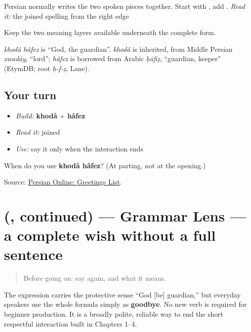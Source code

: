 Persian normally writes the two spoken pieces together. Start with \textbf{}, add \textbf{}. \emph{Read it:} the joined spelling \textbf{} from the right edge

Keep the two meaning layers available underneath the complete form.

\begin{cousinweb}
\emph{khodâ hâfez} is \textquotedblleft{}God, the guardian\textquotedblright{}. \emph{khodâ} is inherited, from Middle Persian \emph{xwadāy}, \textquotedblleft{}lord\textquotedblright{}; \emph{hâfez} is borrowed from Arabic \emph{ḥāfiẓ}, \textquotedblleft{}guardian, keeper\textquotedblright{} (EtymDB; root \emph{ḥ-f-ẓ}, Lane).
\end{cousinweb}

\subsection*{Your turn}
\begin{itemize}
\raggedright
  \item \emph{Build:} \textbf{khodâ} + \textbf{hâfez}
  \item \emph{Read it:} joined \textbf{}
  \item \emph{Use:} say it only when the interaction ends
\end{itemize}

\begin{tcolorbox}[breakable,colback=teal!4,colframe=teal!35!black,title={Before you move on}]
When do you use \textbf{khodâ hâfez}? (At parting, not at the opening.)

Source: \href{https://sites.la.utexas.edu/persian\_online\_resources/vocabulary-lists/meetings-introductions/}{Persian Online: Greetings List}.
\end{tcolorbox}
\section[\texorpdfstring{(\fa{خداحافظ}, continued)}{(خداحافظ, continued)}]{(, continued) — Grammar Lens — a complete wish without a full sentence}

\label{lesson:FA-C05-khodahafez-more}



\begin{quote}
Before going on: say \textbf{} again, and what it means.
\end{quote}

\begin{grammarlens}[title={Grammar Lens — a complete wish without a full sentence}]
The expression carries the protective sense “God {[}be{]} guardian,” but everyday speakers use the whole formula simply as \textbf{goodbye}. No new verb is required for beginner production. It is a broadly polite, reliable way to end the short respectful interaction built in Chapters 1–4.
\end{grammarlens}

